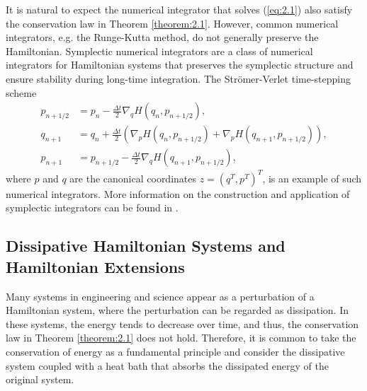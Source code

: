 It is natural to expect the numerical integrator that solves (\ref{eq:2.1}) also satisfy the conservation law in Theorem \ref{theorem:2.1}. However, common numerical integrators, e.g. the Runge-Kutta method, do not generally preserve the Hamiltonian. Symplectic numerical integrators are a class of numerical integrators for Hamiltonian systems that preserves the symplectic structure and ensure stability during long-time integration. The Str\"omer-Verlet time-stepping scheme
\begin{equation} \label{eq:2.3}
\begin{aligned}
	p_{n+1/2} &= p_n - \frac{\Delta t}{2} \nabla_qH(q_{n},p_{n+1/2}), \\
	q_{n+1} &= q_n + \frac{\Delta t}{2} \left( \nabla_pH(q_{n},p_{n+1/2}) + \nabla_pH(q_{n+1},p_{n+1/2}) \right),\\
	p_{n+1} &= p_{n+1/2} - \frac{\Delta t}{2} \nabla_qH(q_{n+1},p_{n+1/2}),
\end{aligned}
\end{equation}
where $p$ and $q$ are the canonical coordinates $z = (q^T,p^T)^T$, is an example of such numerical integrators. More information on the construction and application of symplectic integrators can be found in \cite{Hairer:1250576}.

\subsection{Dissipative Hamiltonian Systems and Hamiltonian Extensions} \label{sec:2.2}

Many systems in engineering and science appear as a perturbation of a Hamiltonian system, where the perturbation can be regarded as dissipation. In these systems, the energy tends to decrease over time, and thus, the conservation law in Theorem \ref{theorem:2.1} does not hold. Therefore, it is common to take the conservation of energy as a fundamental principle and consider the dissipative system coupled with a heat bath that absorbs the dissipated energy of the original system. 

